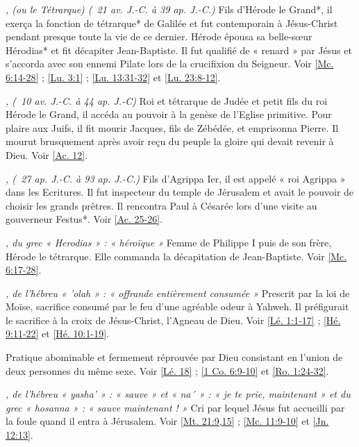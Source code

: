 \begin{multicols}{2}
\textit{, (ou le Tétrarque) (\ 21 av. J.-C. à 39 ap. J.-C.)}\newline
Fils d'Hérode le Grand*, il exerça la fonction de tétrarque* de Galilée et fut contemporain à Jésus-Christ pendant presque toute la vie de ce dernier. Hérode épousa sa belle-sœur Hérodias* et fit décapiter Jean-Baptiste. Il fut qualifié de « renard » par Jésus et s'accorda avec son ennemi Pilate lors de la crucifixion du Seigneur. Voir \vref{Mc. 6:14-28} ; \vref{Lu. 3:1} ; \vref{Lu. 13:31-32} et \vref{Lu. 23:8-12}.

\textit{, (\ 10 av. J.-C. à 44 ap. J.-C)}\newline
Roi et tétrarque de Judée et petit fils du roi Hérode le Grand, il accéda au pouvoir à la genèse de l'Eglise primitive. Pour plaire aux Juifs, il fit mourir Jacques, fils de Zébédée, et emprisonna Pierre. Il mourut brusquement après avoir reçu du peuple la gloire qui devait revenir à Dieu. Voir \vref{Ac. 12}.

\textit{, (\ 27 ap. J.-C. à 93 ap. J.-C.)}\newline
Fils d'Agrippa Ier, il est appelé « roi Agrippa » dans les Ecritures. Il fut inspecteur du temple de Jérusalem et avait le pouvoir de choisir les grands prêtres. Il rencontra Paul à Césarée lors d'une visite au gouverneur Festus*. Voir \vref{Ac. 25-26}.

\textit{, du grec « Herodias » : « héroïque »}\newline
Femme de Philippe I puis de son frère, Hérode le tétrarque. Elle commanda la décapitation de Jean-Baptiste. Voir \vref{Mc. 6:17-28}.

\textit{, de l'hébreu « 'olah » : « offrande entièrement consumée »}\newline
Prescrit par la loi de Moïse, sacrifice consumé par le feu d'une agréable odeur à Yahweh. Il préfigurait le sacrifice à la croix de Jésus-Christ, l'Agneau de Dieu. Voir \vref{Lé. 1:1-17} ; \vref{Hé. 9:11-22} et \vref{Hé. 10:1-19}.

\textit{}\newline
Pratique abominable et fermement réprouvée par Dieu consistant en l'union de deux personnes du même sexe. Voir \vref{Lé. 18} ; \vref{1 Co. 6:9-10} et \vref{Ro. 1:24-32}.

\textit{, de l'hébreu « yasha' » : « sauve » et « na´ » : « je te prie, maintenant » et du grec « hosanna » : « sauve maintenant ! »}\newline
Cri par lequel Jésus fut accueilli par la foule quand il entra à Jérusalem. Voir \vref{Mt. 21:9,15} ; \vref{Mc. 11:9-10} et \vref{Jn. 12:13}.


\end{multicols}
